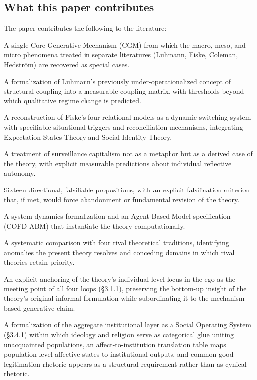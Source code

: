 \documentclass[12pt,a4paper]{article}
\begin{document}
\subsection{What this paper contributes}

The paper contributes the following to the literature:


A single Core Generative Mechanism (CGM) from which the macro, meso, and micro phenomena treated in separate literatures (Luhmann, Fiske, Coleman, Hedström) are recovered as special cases.

A formalization of Luhmann's previously under-operationalized concept of structural coupling into a measurable coupling matrix, with thresholds beyond which qualitative regime change is predicted.

A reconstruction of Fiske's four relational models as a dynamic switching system with specifiable situational triggers and reconciliation mechanisms, integrating Expectation States Theory and Social Identity Theory.

A treatment of surveillance capitalism not as a metaphor but as a derived case of the theory, with explicit measurable predictions about individual reflective autonomy.

Sixteen directional, falsifiable propositions, with an explicit falsification criterion that, if met, would force abandonment or fundamental revision of the theory.

A system-dynamics formalization and an Agent-Based Model specification (COFD-ABM) that instantiate the theory computationally.

A systematic comparison with four rival theoretical traditions, identifying anomalies the present theory resolves and conceding domains in which rival theories retain priority.

An explicit anchoring of the theory's individual-level locus in the ego as the meeting point of all four loops (§3.1.1), preserving the bottom-up insight of the theory's original informal formulation while subordinating it to the mechanism-based generative claim.

A formalization of the aggregate institutional layer as a Social Operating System (§3.4.1) within which ideology and religion serve as categorical glue uniting unacquainted populations, an affect-to-institution translation table maps population-level affective states to institutional outputs, and common-good legitimation rhetoric appears as a structural requirement rather than as cynical rhetoric.
\end{document}
